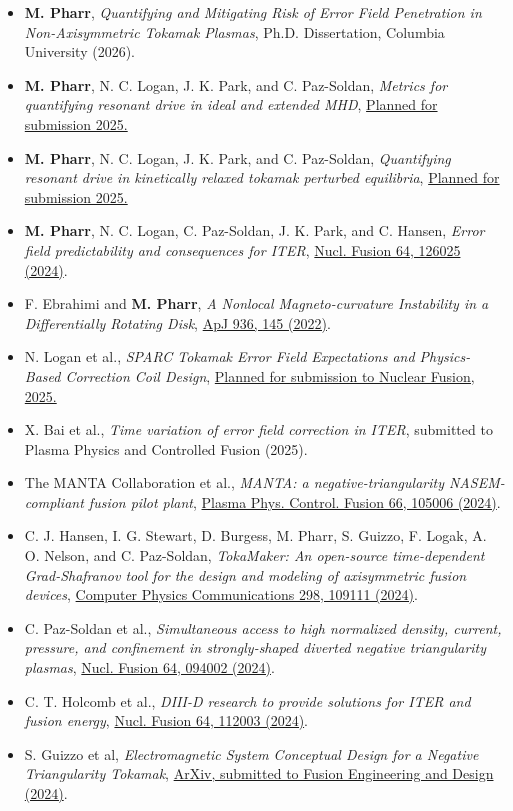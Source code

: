 \documentclass{rpires}
\begin{document}
\begin{resume}
\begin{itemize}  \itemsep -2pt %
    \item {{\bf M. Pharr}, \textit{Quantifying and Mitigating Risk of Error Field Penetration in Non-Axisymmetric Tokamak Plasmas}, Ph.D. Dissertation, Columbia University (2026).}
    \item {{\bf M. Pharr}, N. C. Logan, J. K. Park, and C. Paz-Soldan, \textit{Metrics for quantifying resonant drive in ideal and extended MHD}, \href{}{Planned for submission 2025.}}
    \item {{\bf M. Pharr}, N. C. Logan, J. K. Park, and C. Paz-Soldan, \textit{Quantifying resonant drive in kinetically relaxed tokamak perturbed equilibria}, \href{}{Planned for submission 2025.}}
    \item {{\bf M. Pharr}, N. C. Logan, C. Paz-Soldan, J. K. Park, and C. Hansen, \textit{Error field predictability and consequences for ITER}, \href{https://dx.doi.org/10.1088/1741-4326/ad7ed6}{Nucl. Fusion 64, 126025 (2024)}.}
    \item {F. Ebrahimi and {\bf M. Pharr}, \textit{A Nonlocal Magneto-curvature Instability in a Differentially Rotating Disk}, \href{https://dx.doi.org/10.3847/1538-4357/ac892d}{ApJ 936, 145 (2022)}.}\vspace{0.5cm}
    \item {N. Logan et al., \textit{SPARC Tokamak Error Field Expectations and Physics-Based Correction Coil Design}, \href{}{Planned for submission to Nuclear Fusion, 2025.}}
    \item {X. Bai et al., \textit{Time variation of error field correction in ITER}, submitted to Plasma Physics and Controlled Fusion (2025).}
    \item {The MANTA Collaboration et al., \textit{MANTA: a negative-triangularity NASEM-compliant fusion pilot plant}, \href{https://iopscience.iop.org/article/10.1088/1361-6587/ad6708}{Plasma Phys. Control. Fusion 66, 105006 (2024)}.}
    \item {C. J. Hansen, I. G. Stewart, D. Burgess, M. Pharr, S. Guizzo, F. Logak, A. O. Nelson, and C. Paz-Soldan, \textit{TokaMaker: An open-source time-dependent Grad-Shafranov tool for the design and modeling of axisymmetric fusion devices}, \href{https://www.sciencedirect.com/science/article/pii/S0010465524000341}{Computer Physics Communications 298, 109111 (2024)}.}
    \item {C. Paz-Soldan et al., \textit{Simultaneous access to high normalized density, current, pressure, and confinement in strongly-shaped diverted negative triangularity plasmas}, \href{https://new.iopscience.iop.org/article/10.1088/1741-4326/ad69a4/meta}{Nucl. Fusion 64, 094002 (2024)}.}
    \item {C. T. Holcomb et al., \textit{DIII-D research to provide solutions for ITER and fusion energy}, \href{https://dx.doi.org/10.1088/1741-4326/ad2fe9}{Nucl. Fusion 64, 112003 (2024)}.}
    \item {S. Guizzo et al, \textit{Electromagnetic System Conceptual Design for a Negative Triangularity Tokamak}, \href{ https://doi.org/10.48550/arXiv.2501.14682}{ArXiv, submitted to Fusion Engineering and Design (2024)}.}
\end{itemize}


\end{resume}
\end{document}
